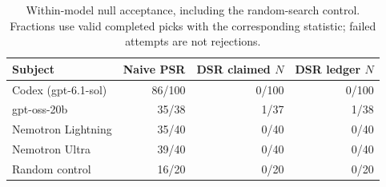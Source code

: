 \begin{table}[tbp]
\centering\small
\setlength{\tabcolsep}{4pt}
\caption{Within-model null acceptance, including the random-search control. Fractions use valid completed picks with the corresponding statistic; failed attempts are not rejections.}\label{tab:model_acceptance}
\begin{tabular}{lrrr}
\toprule
Subject & Naive PSR & DSR claimed $N$ & DSR ledger $N$ \\
\midrule
Codex (gpt-6.1-sol) & 86/100 & 0/100 & 0/100 \\
gpt-oss-20b & 35/38 & 1/37 & 1/38 \\
Nemotron Lightning & 35/40 & 0/40 & 0/40 \\
Nemotron Ultra & 39/40 & 0/40 & 0/40 \\
Random control & 16/20 & 0/20 & 0/20 \\
\bottomrule
\end{tabular}
\end{table}
